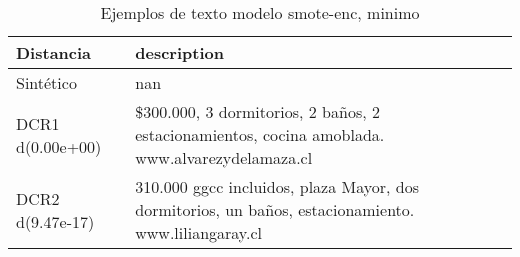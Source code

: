 \begin{table}[H]
\centering
\fontsize{10}{14}\selectfont
\caption{Ejemplos de texto modelo smote-enc, minimo}
\label{table-example-economicos-b-1-smote-enc-min-text}
\begin{tabular}{|l|m{35em}|}
\hline
\rowcolor[gray]{0.8}
Distancia & description \\
\hline Sintético & nan \\
\hline DCR1 d(0.00e+00) & \$300.000, 3 dormitorios, 2 ba\~nos, 2 estacionamientos, cocina amoblada. www.alvarezydelamaza.cl \\
\hline DCR2 d(9.47e-17) & 310.000 ggcc incluidos, plaza Mayor, dos dormitorios, un ba\~nos, estacionamiento. www.liliangaray.cl \\
\hline
\end{tabular}
\end{table}
